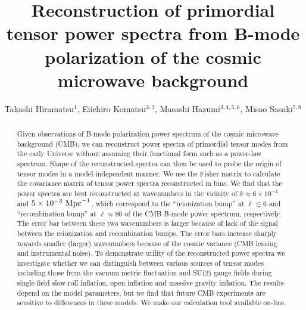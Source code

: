 \documentclass[tightenlines,floats,aps,nofootinbib,prd,onecolumn,preprintnumbers]{revtex4}
\begin{document}
\title{Reconstruction of primordial tensor power spectra from B-mode
polarization of the cosmic microwave background}
\author{
Takashi Hiramatsu$^1$,
Eiichiro Komatsu$^{2,3}$,
Masashi Hazumi$^{3,4,5,6}$,
Misao Sasaki$^{7,8}$
}

\begin{abstract}
Given observations of B-mode polarization power spectrum of the cosmic
 microwave background (CMB), we can reconstruct power spectra of
 primordial tensor modes from the early Universe without assuming their
 functional form such as a power-law spectrum. Shape of the reconstructed
 spectra can then be used to probe the origin of tensor modes in a
 model-independent manner. We use the Fisher matrix to calculate the
 covariance matrix of tensor power spectra reconstructed in bins.
 We find that the power spectra are best reconstructed at
 wavenumbers in the vicinity of $k\approx 6\times 10^{-4}$ and $5\times
 10^{-3}~{\rm Mpc}^{-1}$, which correspond to the ``reionization bump''
 at $\ell\lesssim 6$ and ``recombination bump'' at $\ell\approx 80$ of
 the CMB B-mode power spectrum, respectively. The error bar between
 these two wavenumbers is larger because of lack of the signal between
 the reionization and recombination bumps. The error bars increase
 sharply towards smaller (larger) wavenumbers because of the cosmic
 variance (CMB lensing and instrumental noise).
 To demonstrate utility of the reconstructed power spectra we
 investigate whether we can distinguish between various sources of tensor
 modes including those from the vacuum metric fluctuation and SU(2) gauge
 fields during single-field slow-roll inflation, open inflation and
 massive gravity inflation.  The results depend on the
 model parameters, but we find that future CMB experiments are sensitive
 to differences in these models. We make our calculation tool available
 on-line.
\end{abstract}
\end{document}
